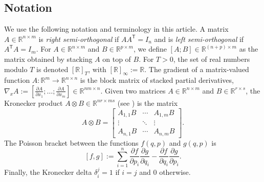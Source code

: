 \documentclass[journal,twoside,web]{ieeecolor}
\newcommand*{\tpose}{^\mathsf{T}}
\newcommand*{\Rt}[1]{[\R]_{#1}}
\newcommand*{\R}{\mathbb{R}}
\newcommand*{\Id}[1]{I_{#1}}
\newcommand*{\pdiff}[2]{\frac{\partial #1}{\partial #2}}
\begin{document}
\subsection{Notation}
We use the following notation and terminology in this article.
A matrix \(A \in \R^{n \times m}\) is \textit{right semi-orthogonal} if
\(A A\tpose = \Id{n}\) and is \textit{left semi-orthogonal} if 
\(A\tpose A = \Id{m}\).
For \(A \in \R^{n\times m}\) and \(B \in \R^{p \times m}\),
we define \([A;B] \in \R^{(n+p)\times m}\) as the matrix obtained by stacking \(A\)
on top of \(B\). 
For \(T > 0\), the set of real numbers modulo \(T\) is denoted \(\Rt{T}\), with
\(\Rt{\infty} := \R\).
The gradient of a matrix-valued function 
\(A : \R^m \rightarrow \R^{n\times n}\) is the block matrix of stacked partial
derivatives, 
\(\nabla_xA := [\pdiff{A}{x_1};\ldots;\pdiff{A}{x_m}] \in \R^{nm \times n}\).
Given two matrices \(A \in \R^{n \times m}\) and \(B \in \R^{r \times s}\), the
Kronecker product \(A \otimes B \in \R^{nr \times ms}\) (see \cite{kronprod}) is
the matrix
\begin{equation}\label{eqn:kronprod}
    A \otimes B = \begin{bmatrix}
        A_{1,1}B & \cdots & A_{1,m} B \\
        \vdots & \ddots & \vdots \\
        A_{n,1} B & \cdots & A_{n,m} B
    \end{bmatrix} 
    .
\end{equation}
The Poisson bracket \cite{landau_mechanics} between the functions
\(f(q,p)\) and \(g(q,p)\) is
\begin{equation}\label{eqn:poisson-bracket}
    [f,g] := \sum \limits_{i=1}^n \pdiff{f}{p_i}\pdiff{g}{q_i} - 
        \pdiff{f}{q_i}\pdiff{g}{p_i}
    .
\end{equation}
Finally, the Kronecker delta \(\delta_i^j = 1\) if \(i = j\) and \(0\)
otherwise.

\end{document}
